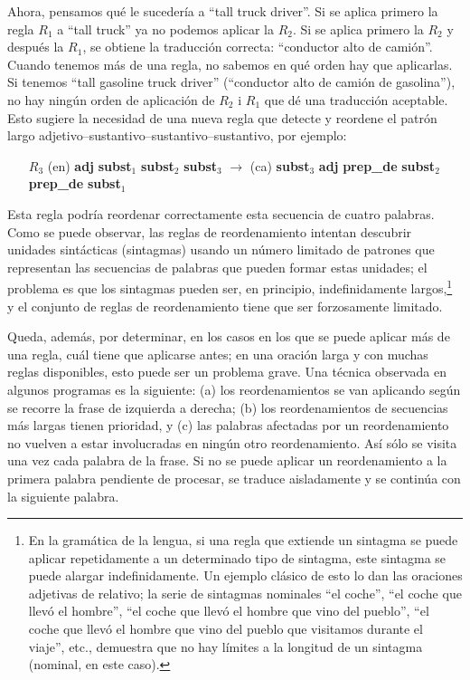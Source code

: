 Ahora, pensamos qué le sucedería a ``tall truck driver''. Si se aplica primero la regla $R_1$ a ``tall truck'' ya no podemos aplicar la $R_2$. Si se aplica primero la $R_2$ y después la $R_1$, se obtiene la traducción correcta: ``conductor alto de camión''. Cuando tenemos más de una regla, no sabemos en qué orden hay que aplicarlas. Si tenemos ``tall gasoline truck driver'' (``conductor alto de camión de gasolina''), no hay ningún orden de aplicación de $R_2$ i $R_1$ que dé una traducción aceptable. Esto sugiere la necesidad de una nueva regla que detecte y reordene el patrón largo adjetivo--sustantivo--sustantivo--sustantivo, por ejemplo: \begin{itemize} \item[$R_3$] (en) \textbf{adj} \textbf{subst}$_1$ \textbf{subst}$_2$ \textbf{subst}$_3$ $\rightarrow$ (ca) \textbf{subst}$_3$ \textbf{adj} \textbf{prep\_de} \textbf{subst}$_2$ \textbf{prep\_de} \textbf{subst}$_1$ \end{itemize} Esta regla podría reordenar correctamente esta secuencia de cuatro palabras. Como se puede observar, las reglas de reordenamiento intentan descubrir unidades sintácticas (sintagmas) usando un número limitado de patrones que representan las secuencias de palabras que pueden formar estas unidades; el problema es que los sintagmas pueden ser, en principio, indefinidamente largos,\footnote{En la gramática de la lengua, si una regla que extiende un sintagma se puede aplicar repetidamente a un determinado tipo de sintagma, este sintagma se puede alargar indefinidamente. Un ejemplo clásico de esto lo dan las oraciones adjetivas de relativo; la serie de sintagmas nominales ``el coche'', ``el coche que llevó el hombre'', ``el coche que llevó el hombre que vino del pueblo'', ``el coche que llevó el hombre que vino del pueblo que visitamos durante el viaje'', etc., demuestra que no hay límites a la longitud de un sintagma (nominal, en este caso).} y el conjunto de reglas de reordenamiento tiene que ser forzosamente limitado. 

Queda, además, por determinar, en los casos en los que se puede aplicar más de una regla, cuál tiene que aplicarse antes; en una oración larga y con muchas reglas disponibles, esto puede ser un problema grave. Una técnica observada en algunos programas es la siguiente: (a) los reordenamientos se van aplicando según se recorre la frase de izquierda a derecha; (b) los reordenamientos de secuencias más largas tienen prioridad, y (c) las palabras afectadas por un reordenamiento no vuelven a estar involucradas en ningún otro reordenamiento. Así sólo se visita una vez cada palabra de la frase. Si no se puede aplicar un reordenamiento a la primera palabra pendiente de procesar, se traduce aisladamente y se continúa con la siguiente palabra. 


